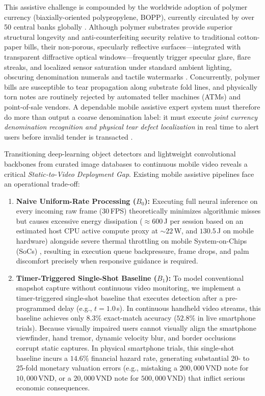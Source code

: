 \documentclass[final,5p,times,twocolumn,authoryear]{elsarticle}
\begin{document}
This assistive challenge is compounded by the worldwide adoption of polymer currency (biaxially-oriented polypropylene, BOPP), currently circulated by over 50 central banks globally \cite{vanRenesse2005,deHeij2006}. Although polymer substrates provide superior structural longevity and anti-counterfeiting security relative to traditional cotton-paper bills, their non-porous, specularly reflective surfaces---integrated with transparent diffractive optical windows---frequently trigger specular glare, flare streaks, and localized sensor saturation under standard ambient lighting, obscuring denomination numerals and tactile watermarks \cite{vanRenesse2005,deHeij2006,Fu2021}. Concurrently, polymer bills are susceptible to tear propagation along substrate fold lines, and physically torn notes are routinely rejected by automated teller machines (ATMs) and point-of-sale vendors. A dependable mobile assistive expert system must therefore do more than output a coarse denomination label: it must execute \textit{joint currency denomination recognition and physical tear defect localization} in real time to alert users before invalid tender is transacted \cite{Pham2017,Pham2018,tasnim2021,park2023}.

Transitioning deep-learning object detectors \cite{Redmon2016,Bochkovskiy2020,Jocher2023} and lightweight convolutional backbones \cite{Howard2019,Sandler2018,Tan2021} from curated image databases to continuous mobile video reveals a critical \textit{Static-to-Video Deployment Gap}. Existing mobile assistive pipelines face an operational trade-off:
\begin{enumerate}[label=(\alph*)]
    \item \textbf{Naive Uniform-Rate Processing ($B_0$):} Executing full neural inference on every incoming raw frame ($30$\,FPS) theoretically minimizes algorithmic misses but causes excessive energy dissipation ($\approx 600$\,J per session based on an estimated host CPU active compute proxy at $\sim 22$\,W, and $130.5$\,J on mobile hardware) alongside severe thermal throttling on mobile System-on-Chips (SoCs) \cite{Ignatov2018,Lane2016}, resulting in execution queue backpressure, frame drops, and palm discomfort precisely when responsive guidance is required.
    \item \textbf{Timer-Triggered Single-Shot Baseline ($B_1$):} To model conventional snapshot capture without continuous video monitoring, we implement a timer-triggered single-shot baseline that executes detection after a pre-programmed delay (e.g., $t = 1.0$\,s). In continuous handheld video streams, this baseline achieves only $8.3\%$ exact-match accuracy ($52.8\%$ in live smartphone trials). Because visually impaired users cannot visually align the smartphone viewfinder, hand tremor, dynamic velocity blur, and border occlusions corrupt static captures. In physical smartphone trials, this single-shot baseline incurs a $14.6\%$ financial hazard rate, generating substantial 20- to 25-fold monetary valuation errors (e.g., mistaking a $200{,}000$\,VND note for $10{,}000$\,VND, or a $20{,}000$\,VND note for $500{,}000$\,VND) that inflict serious economic consequences.
\end{enumerate}
\end{document}
